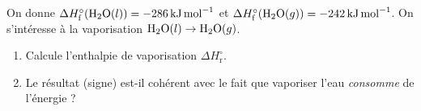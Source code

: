 \documentclass[11pt,a4paper]{article}
\begin{document}
\begin{exo}
On donne $\Delta H^\circ_{\text{f}}(\ce{H2O}(l))=\qty{-286}{\kilo\joule\per\mol}$ et $\Delta H^\circ_{\text{f}}(\ce{H2O}(g))=\qty{-242}{\kilo\joule\per\mol}$. On s'intéresse à la vaporisation $\ce{H2O}(l) \rightarrow \ce{H2O}(g)$.
\begin{enumerate}[label=\alph*)]
  \item Calcule l'enthalpie de vaporisation $\Delta H^\circ_{\text{r}}$.
  \item Le résultat (signe) est-il cohérent avec le fait que vaporiser l'eau \emph{consomme} de l'énergie ?
\end{enumerate}
\end{exo}
\end{document}
